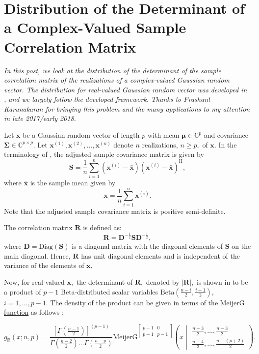 \section{Distribution of the Determinant of a Complex-Valued Sample Correlation Matrix}

\emph{In this post, we look at the distribution of the determinant of the sample correlation matrix of the realizations of a complex-valued Gaussian random vector. The distribution for real-valued Gaussian random vector was developed in \cite{PhamGia2014}, and we largely follow the developed framework. Thanks to Prashant Karunakaran for bringing this problem and the many applications to my attention in late 2017/early 2018.}

Let $\boldsymbol{x}$ be a Gaussian random vector of length $p$ with mean $\boldsymbol{\mu} \in \mathbb{C}^p$ and covariance $\boldsymbol{\Sigma} \in \mathbb{C}^{p\times p}.$ Let $\boldsymbol{x}^{(1)}, \boldsymbol{x}^{(2)}, \dots, \boldsymbol{x}^{(n)}$ denote $n$ realizations, $n \geq p,$ of $\boldsymbol{x}.$ In the terminology of \cite{PhamGia2014}, the adjusted sample covariance matrix is given by $$\boldsymbol{S} = \frac{1}{n}\sum_{i = 1}^{n}(\boldsymbol{x}^{(i)} - \bar{\boldsymbol{x}})(\boldsymbol{x}^{(i)} - \bar{\boldsymbol{x}})^\mathrm{H},$$ where $\bar{\boldsymbol{x}}$ is the sample mean given by $$\bar{\boldsymbol{x}} = \frac{1}{n}\sum_{i = 1}^{n}\boldsymbol{x}^{(i)}.$$ Note that the adjusted sample covariance matrix is positive semi-definite.

The correlation matrix $\boldsymbol{R}$ is defined as: $$\boldsymbol{R} = \boldsymbol{D}^{-\frac{1}{2}} \boldsymbol{S} \boldsymbol{D}^{-\frac{1}{2}},$$ where $\boldsymbol{D} = \mathrm{Diag}(\boldsymbol{S})$ is a diagonal matrix with the diagonal elements of $\boldsymbol{S}$ on the main diagonal. Hence, $\boldsymbol{R}$ has unit diagonal elements and is independent of the variance of the elements of $\boldsymbol{x}.$ 

Now, for real-valued $\boldsymbol{x},$ the determinant of $\boldsymbol{R},$ denoted by $|\boldsymbol{R}|,$ is shown in \cite[Theorem 2]{PhamGia2014} to be a product of $p-1$ Beta-distributed scalar variables $\mathrm{Beta}(\frac{n-i}{2},\frac{i-1}{2}),$  $i=1,\dots,p-1.$ The density of the product can be given in terms of the \href{https://mathworld.wolfram.com/MeijerG-Function.html}{$\mathrm{MeijerG}$ function} as follows \cite[Theorem 2]{PhamGia2014}:

$$g_\mathbb{R}(x;n,p) = \frac{\left[\Gamma(\frac{n-1}{2})\right]^{(p-1)} }{\Gamma(\frac{n-2}{2})\dots\Gamma(\frac{n-p}{2})} \mathrm{MeijerG}^{\begin{bmatrix}p-1 & 0 \\ p-1 & p-1\end{bmatrix}}\left(x\middle|\begin{matrix}\frac{n-3}{2},\dots,\frac{n-3}{2}\\ \frac{n-4}{2},\dots,\frac{n-(p+2)}{2}\end{matrix}\right).$$


